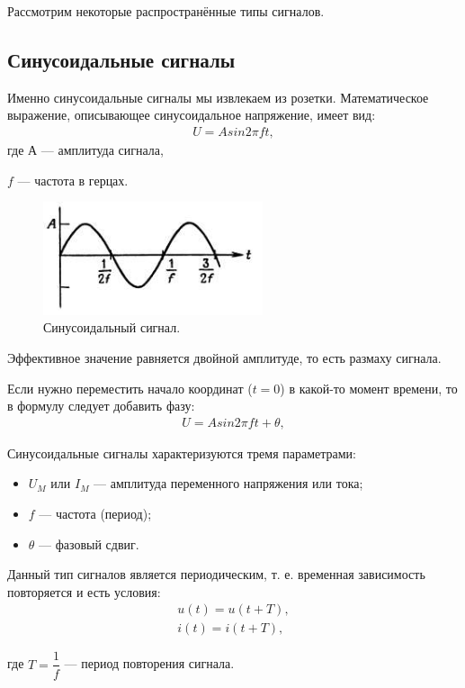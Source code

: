 	Рассмотрим некоторые распространённые типы сигналов.
\subsection{Синусоидальные сигналы}
	Именно синусоидальные сигналы мы извлекаем из розетки. Математическое выражение, описывающее синусоидальное напряжение, имеет вид:
	\begin{gather}
	U=A sin2 \pi ft,
	\end{gather}
	где А --- амплитуда сигнала,
	
	$f$ --- частота в герцах.

	\begin{figure}[H]
    \centering
    \includegraphics[width=0.575\textwidth]{../image/s_sin.png}
    \caption{Синусоидальный сигнал.}
	\end{figure}
	Эффективное значение равняется двойной амплитуде, то есть размаху сигнала. 

	Если нужно переместить начало координат ($t=0$) в какой-то момент времени, то в формулу следует добавить фазу:
	\begin{gather}
	U=A sin2 \pi ft + \theta,
	\end{gather}
	
	Синусоидальные сигналы характеризуются тремя параметрами:
	\begin{itemize}
		\item $U_{M}$ или $I_{M}$ --- амплитуда переменного напряжения или тока;
		\item $f$ --- частота (период);
		\item $\theta$ --- фазовый сдвиг.
	\end{itemize}

	Данный тип сигналов является периодическим, т. е. временная зависимость повторяется и есть условия:
	\begin{gather}
	u(t)=u(t+T),\\
	i(t)=i(t+T), 
	\end{gather}
	
	где $T=\dfrac{1}{f}$ --- период повторения сигнала.
	
